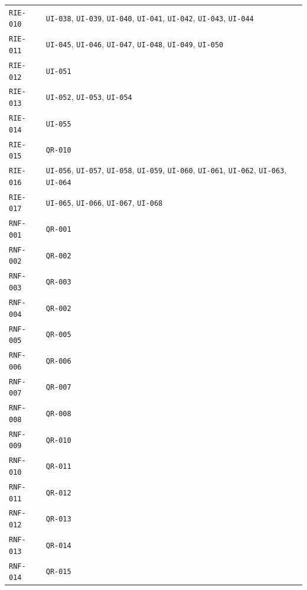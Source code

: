 \documentclass[10pt,letterpaper]{article}
\begin{document}
\begin{longtable}{P{3.0cm}P{10.6cm}}
\texttt{RIE-010} & \texttt{UI-038}, \texttt{UI-039}, \texttt{UI-040}, \texttt{UI-041}, \texttt{UI-042}, \texttt{UI-043}, \texttt{UI-044}\\
\texttt{RIE-011} & \texttt{UI-045}, \texttt{UI-046}, \texttt{UI-047}, \texttt{UI-048}, \texttt{UI-049}, \texttt{UI-050}\\
\texttt{RIE-012} & \texttt{UI-051}\\
\texttt{RIE-013} & \texttt{UI-052}, \texttt{UI-053}, \texttt{UI-054}\\
\texttt{RIE-014} & \texttt{UI-055}\\
\texttt{RIE-015} & \texttt{QR-010}\\
\texttt{RIE-016} & \texttt{UI-056}, \texttt{UI-057}, \texttt{UI-058}, \texttt{UI-059}, \texttt{UI-060}, \texttt{UI-061}, \texttt{UI-062}, \texttt{UI-063}, \texttt{UI-064}\\
\texttt{RIE-017} & \texttt{UI-065}, \texttt{UI-066}, \texttt{UI-067}, \texttt{UI-068}\\
\texttt{RNF-001} & \texttt{QR-001}\\
\texttt{RNF-002} & \texttt{QR-002}\\
\texttt{RNF-003} & \texttt{QR-003}\\
\texttt{RNF-004} & \texttt{QR-002}\\
\texttt{RNF-005} & \texttt{QR-005}\\
\texttt{RNF-006} & \texttt{QR-006}\\
\texttt{RNF-007} & \texttt{QR-007}\\
\texttt{RNF-008} & \texttt{QR-008}\\
\texttt{RNF-009} & \texttt{QR-010}\\
\texttt{RNF-010} & \texttt{QR-011}\\
\texttt{RNF-011} & \texttt{QR-012}\\
\texttt{RNF-012} & \texttt{QR-013}\\
\texttt{RNF-013} & \texttt{QR-014}\\
\texttt{RNF-014} & \texttt{QR-015}\\
\bottomrule
\end{longtable}
\end{document}
